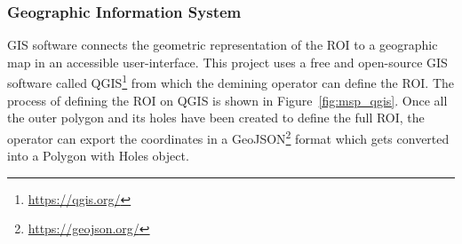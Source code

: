 \subsubsection{Geographic Information System}

\gls{GIS} software connects the geometric representation of the \gls{ROI} to a geographic map in an accessible user-interface. This project uses a free and open-source \gls{GIS} software called \gls{QGIS}\footnote{\url{https://qgis.org/}} from which the demining operator can define the \gls{ROI}. The process of defining the \gls{ROI} on \gls{QGIS} is shown in Figure~\ref{fig:msp_qgis}. Once all the outer polygon and its holes have been created to define the full \gls{ROI}, the operator can export the coordinates in a GeoJSON\footnote{\url{https://geojson.org/}} format which gets converted into a Polygon with Holes object.


